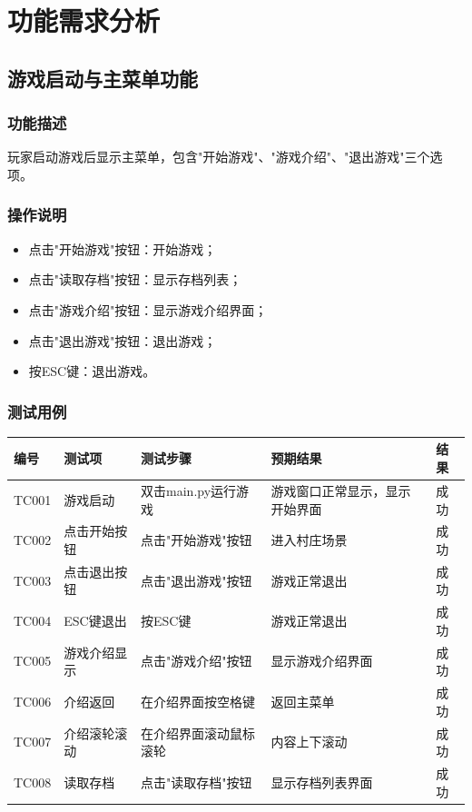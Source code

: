 \documentclass[a4paper,12pt]{article}
\begin{document}
\section{功能需求分析}

\subsection{游戏启动与主菜单功能}

\subsubsection{功能描述}
玩家启动游戏后显示主菜单，包含"开始游戏"、"游戏介绍"、"退出游戏"三个选项。

\subsubsection{操作说明}
\begin{itemize}[leftmargin=2em]
    \item 点击"开始游戏"按钮：开始游戏；
    \item 点击"读取存档"按钮：显示存档列表；
    \item 点击"游戏介绍"按钮：显示游戏介绍界面；
    \item 点击"退出游戏"按钮：退出游戏；
    \item 按ESC键：退出游戏。
\end{itemize}

\subsubsection{测试用例}
\begin{longtable}{p{1.2cm} p{2.8cm} p{4cm} p{3.5cm} p{1.5cm}}
\toprule
\textbf{编号} & \textbf{测试项} & \textbf{测试步骤} & \textbf{预期结果} & \textbf{结果} \\
\midrule
\endhead
TC001 & 游戏启动 & 双击main.py运行游戏 & 游戏窗口正常显示，显示开始界面 & 成功 \\
TC002 & 点击开始按钮 & 点击"开始游戏"按钮 & 进入村庄场景 & 成功 \\
TC003 & 点击退出按钮 & 点击"退出游戏"按钮 & 游戏正常退出 & 成功 \\
TC004 & ESC键退出 & 按ESC键 & 游戏正常退出 & 成功 \\
TC005 & 游戏介绍显示 & 点击"游戏介绍"按钮 & 显示游戏介绍界面 & 成功 \\
TC006 & 介绍返回 & 在介绍界面按空格键 & 返回主菜单 & 成功 \\
TC007 & 介绍滚轮滚动 & 在介绍界面滚动鼠标滚轮 & 内容上下滚动 & 成功 \\
TC008 & 读取存档 & 点击"读取存档"按钮 & 显示存档列表界面 & 成功 \\
\bottomrule
\end{longtable}
\end{document}
